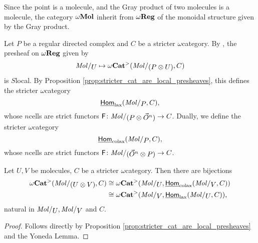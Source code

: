 \begin{rmk}
    Since the point is a molecule, and the Gray product of two molecules is a molecule, the category \( \omega\mathbf{Mol} \) inherit from \( \omega\mathbf{Reg} \) of the monoidal structure given by the Gray product. 
\end{rmk}

\begin{dfn} 
    Let \( P \) be a regular directed complex and \( C \) be a stricter \( \omega \)\nbd category.
    By \cite[Lemma 7.2.8]{hadzihasanovic2024combinatorics}, the presheaf on \( \omega\mathbf{Reg} \) given by
    \begin{equation*}
        \molecin{U} \mapsto \somegaCat(\molecin{(P \gray U)}, C) 
    \end{equation*}
    is \( S \)\nbd local.
    By Proposition \ref{prop:stricter_cat_are_local_presheaves}, this defines the stricter \( \omega \)\nbd category 
    \begin{equation*}
        \homlax(\molecin{P}, C),
    \end{equation*}
    whose \( n \)\nbd cells are strict functors \( \F \colon \molecin{(P \gray \dglobe{n})} \to C \).
    Dually, we define the stricter \( \omega \)\nbd category
    \begin{equation*}
        \homcolax(\molecin{P}, C),
    \end{equation*}
    whose \( n \)\nbd cells are strict functors \( \F \colon \molecin{(\dglobe{n} \gray P)} \to C \).
\end{dfn}

\begin{lem}
    Let \( U, V \) be molecules, \( C \) be a stricter \( \omega \)\nbd category.
    Then there are bijections
    \begin{align*}
        \somegaCat(\molecin{(U \gray V)}, C) &\cong \somegaCat(\molecin{U}, \homcolax(\molecin{V}, C)) \\
                                             &\cong \somegaCat(\molecin{V}, \homlax(\molecin{U}, C)),
    \end{align*}
    natural in \( \molecin{U}, \molecin{V} \) and \( C \).
\end{lem}
\begin{proof}
    Follows directly by Proposition \ref{prop:stricter_cat_are_local_presheaves} and the Yoneda Lemma. 
\end{proof}

